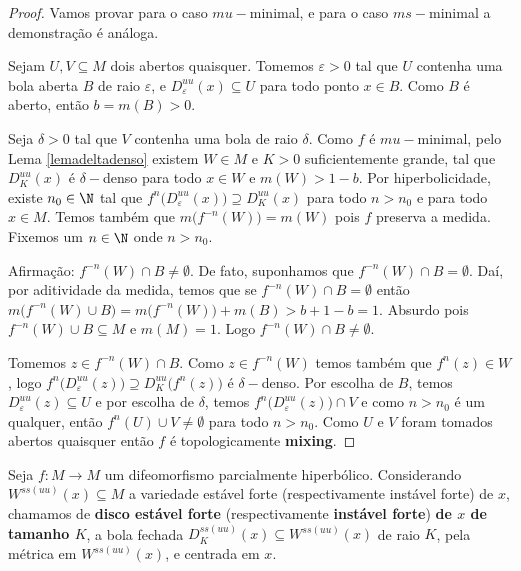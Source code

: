 \begin{proof} Vamos provar para o caso $mu-$minimal, e para o caso $ms-$minimal a demonstração é análoga.

Sejam $U,V\subseteq M$ dois abertos quaisquer. Tomemos $\varepsilon>0$ tal que $U$ contenha uma bola aberta $B$ de raio $\varepsilon$, e $D^{uu}_{\varepsilon}(x)\subseteq U$ para todo ponto $x\in B$. Como $B$ é aberto, então $b=m(B)>0$.

Seja $\delta>0$ tal que $V$ contenha uma bola de raio $\delta$. Como $f$ é $mu-$minimal, pelo Lema \ref{lemadeltadenso} existem $W\in M$ e $K>0$ suficientemente grande, tal que $D^{uu}_{K}(x)$ é $\delta-$denso para todo $x\in W$ e $m(W)>1-b$. Por hiperbolicidade, existe $n_0\in\N$ tal que $f^{n}\big(D^{uu}_{\varepsilon}(x)\big)\supseteq D^{uu}_{K}(x)$ para todo $n>n_0$ e para todo $x\in M$. Temos também que $m\big(f^{-n}(W)\big)=m(W)$ pois $f$ preserva a medida. Fixemos um $n\in \N$ onde $n>n_0$.

Afirmação: $f^{-n}(W)\cap B\neq\emptyset$. De fato, suponhamos que $f^{-n}(W)\cap B=\emptyset$. Daí, por aditividade da medida, temos que se $f^{-n}(W)\cap B=\emptyset$ então $m\big(f^{-n}(W)\cup B\big)=m\big(f^{-n}(W)\big)+m(B)>b+1-b=1$. Absurdo pois $f^{-n}(W)\cup B\subseteq M$ e $m(M)=1$. Logo $f^{-n}(W)\cap B\neq\emptyset$. 

Tomemos $z\in f^{-n}(W)\cap B$. Como $z\in f^{-n}(W)$ temos também que $f^n(z)\in W$, logo $f^{n}\big(D^{uu}_{\varepsilon}(z)\big)\supseteq D^{uu}_{K}\big(f^{n}(z)\big)$ é $\delta-$denso. Por escolha de $B$, temos $D^{uu}_{\varepsilon}(z)\subseteq U$ e por escolha de $\delta$, temos $f^{n}\big(D^{uu}_{\varepsilon}(z)\big)\cap V$ e como $n>n_0$ é um qualquer, então $f^n(U)\cup V\neq\emptyset$ para todo $n>n_0$. Como $U$ e $V$ foram tomados abertos quaisquer então $f$ é topologicamente \textbf{mixing}.
\end{proof}





\begin{definicao} Seja $f:M\to M$ um difeomorfismo parcialmente hiperbólico. Considerando $W^{ss(uu)}(x)\subseteq M$ a variedade estável forte (respectivamente instável forte) de $x$, chamamos de \textbf{disco estável forte} (respectivamente \textbf{instável forte}) \textbf{de $x$ de tamanho $K$}, a bola fechada $D_K^{ss(uu)}(x)\subseteq W^{ss(uu)}(x)$ de raio $K$, pela métrica em $W^{ss(uu)}(x)$, e centrada em $x$.
\end{definicao}

